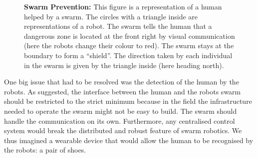 \documentclass[oneside, a4paper, 12pt]{memoir}
\newcommand{\epuck}[3][0] %
{
	\draw [very thick, fill=white] (#2,#3) circle [radius=0.5];
	\draw [very thick, rotate around={#1:(#2,#3)}] (#2-0.25,#3-0.433) -- (#2,#3+0.45) -- (#2+0.25,#3-0.433);
}
\newcommand{\epuckred}[3][0] %
{
	\draw [very thick, fill=white] (#2,#3) circle [radius=0.5];
	\draw [red, very thick, rotate around={#1:(#2,#3)}] (#2-0.25,#3-0.433) -- (#2,#3+0.45) -- (#2+0.25,#3-0.433);
}
\let\oldCaption\caption
\renewcommand{\caption}[2]{
\oldCaption[#1]{{\small\sffamily\bfseries #1:} #2}
}
\begin{document}
	\begin{figure}\centering
		
		\caption{Swarm Prevention}{This figure is a representation of a human helped by a swarm. The circles with a triangle inside are representations of a robot. The swarm tells the human that a dangerous zone is located at the front right by visual communication (here the robots change their colour to red). The swarm stays at the boundary to form a \enquote{shield}. The direction taken by each individual in the swarm is given by the triangle inside (here heading north).}
		\label{fig:swarm_preventing}
	\end{figure}
	
	One big issue that had to be resolved was the detection of the human by the robots. As \citet{podevijn2012self} suggested, the interface between the human and the robots swarm should be restricted to the strict minimum because in the field the infrastructure needed to operate the swarm might not be easy to build. The swarm should handle the communication on its own. Furthermore, any centralised control system would break the distributed and robust feature of swarm robotics. We thus imagined a wearable device that would allow the human to be recognised by the robots: a pair of shoes.\\
	
\end{document}
